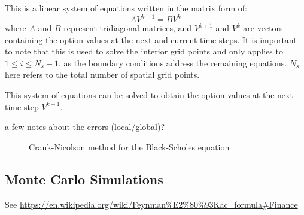 This is a linear system of equations written in the matrix form of:
\[
    AV^{k+1} = BV^{k}
\]
where $A$ and $B$ represent tridiagonal matrices, and $V^{k+1}$ and $V^{k}$ are vectors containing the option values at the next and current time steps. It is important to note that this is used to solve the interior grid points and only applies to $1 \leq i \leq N_s - 1$, as the boundary conditions address the remaining equations. $N_s$ here refers to the total number of spatial grid points.

This system of equations can be solved to obtain the option values at the next time step $V^{k+1}$.

{\color{red} a few notes about the errors (local/global)?}

\begin{figure}[H]
    \centering
    \caption{Crank-Nicolson method for the Black-Scholes equation}
    \label{fig:bse-cn}
\end{figure}

\subsection{Monte Carlo Simulations}
See \url{https://en.wikipedia.org/wiki/Feynman%E2%80%93Kac_formula#Finance}